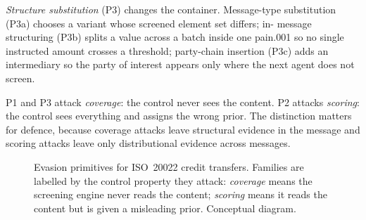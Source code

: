 \documentclass[conference]{IEEEtran}
\begin{document}
\emph{Structure substitution} (P3) changes the container. Message-type
substitution (P3a) chooses a variant whose screened element set differs; in-
message structuring (P3b) splits a value across a batch inside one pain.001
so no single instructed amount crosses a threshold; party-chain insertion
(P3c) adds an intermediary so the party of interest appears only where the
next agent does not screen.

P1 and P3 attack \emph{coverage}: the control never sees the content. P2
attacks \emph{scoring}: the control sees everything and assigns the wrong
prior. The distinction matters for defence, because coverage attacks leave
structural evidence in the message and scoring attacks leave only
distributional evidence across messages.

\begin{figure}[!tbp]
\centering
{}
\caption{Evasion primitives for ISO~20022 credit transfers. Families are
labelled by the control property they attack: \emph{coverage} means the
screening engine never reads the content; \emph{scoring} means it reads the
content but is given a misleading prior. Conceptual diagram.}
\label{fig:taxonomy}
\end{figure}
\end{document}

